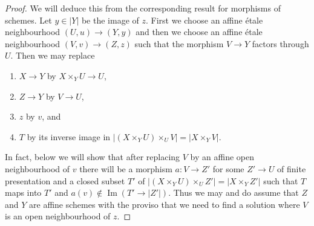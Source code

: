 \documentclass{stacks-project}
\theoremstyle{plain}
\theoremstyle{definition}
\theoremstyle{remark}
\numberwithin{equation}{subsection}
\def\Im{\mathop{\mathrm{Im}}}
\begin{document}
\begin{proof}
We will deduce this from the corresponding result for morphisms of schemes.
Let $y \in |Y|$ be the image of $z$. First we choose an affine \'etale
neighbourhood $(U, u) \to (Y, y)$ and then we choose an affine \'etale
neighbourhood $(V, v) \to (Z, z)$ such that the morphism $V \to Y$
factors through $U$. Then we may replace
\begin{enumerate}
\item $X \to Y$ by $X \times_Y U \to U$,
\item $Z \to Y$ by $V \to U$,
\item $z$ by $v$, and
\item $T$ by its inverse image in
$|(X \times_Y U) \times_U V| = |X \times_Y V|$.
\end{enumerate}
In fact, below we will show that after replacing $V$ by an affine
open neighbourhood of $v$ there will be a morphism $a : V \to Z'$ for
some $Z' \to U$ of finite presentation and a closed subset $T'$
of $|(X \times_Y U) \times_U Z'| = |X \times_Y Z'|$ such that
$T$ maps into $T'$ and $a(v) \not \in \Im(T' \to |Z'|)$.
Thus we may and do assume that $Z$ and $Y$ are affine schemes
with the proviso that we need to find a solution where $V$
is an open neighbourhood of $z$.


\end{proof}
\end{document}

